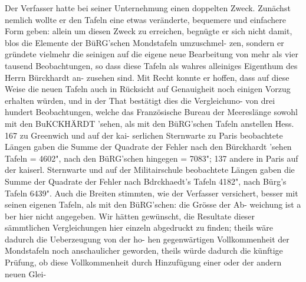 \documentclass[12pt,a4paper]{article}
\begin{document}
Der Verfasser hatte bei seiner Unternehmung einen doppelten Zweck. Zunächst nemlich wollte\newline
er den Tafeln eine etwas veränderte, bequemere und einfachere Form geben: allein um diesen Zweck\newline
zu erreichen, begnügte er sich nicht damit, blos die Elemente der BüRG'schen Mondstafeln umzuschmel-\newline
zen, sondern er gründete vielmehr die seinigen auf die eigene neue Bearbeitung von mehr als vier\newline
tausend Beobachtungen, so dass diese Tafeln als wahres alleiniges Eigenthum des Herrn Bürckhardt an-\newline
zusehen sind. Mit Recht konnte er hoffen, dass auf diese Weise die neuen Tafeln auch in Rücksicht\newline
auf Genauigheit noch einigen Vorzug erhalten würden, und in der That bestätigt dies die Vergleichuno-\newline
von drei hundert Beobachtungen, welche das Französische Bureau der Meereslänge sowohl mit den\newline
BuKCKHÄRDT 'sehen, als mit den BüRG'schen Tafeln anstellen Hess. 167 zu Greenwich und auf der kai-\newline
serlichen Sternwarte zu Paris beobachtete Längen gaben die Summe der Quadrate der Fehler nach den\newline
Bürckhardt 'sehen Tafeln = 4602", nach den BüRG'schen hingegen = 7083"; 137 andere in Paris auf der\newline
kaiserl. Sternwarte und auf der Militairschule beobachtete Längen gaben die Summe der Quadrate der\newline
Fehler nach Bdrckhaedt's Tafeln 4182", nach Bürg's Tafeln 6439". Auch die Breiten stimmten, wie\newline
der Verfasser versichert, besser mit seinen eigenen Tafeln, als mit den BüRG'schen: die Grösse der Ab-\newline
weichung ist a ber hier nicht angegeben. Wir hätten gewünscht, die Resultate dieser sämmtlichen\newline
Vergleichungen hier einzeln abgedruckt zu finden; theils wäre dadurch die Ueberzeugung von der ho-\newline
hen gegenwärtigen Vollkommenheit der Mondstafeln noch anschaulicher geworden, theils würde dadurch\newline
die künftige Prüfung, ob diese Vollkommenheit durch Hinzufügung einer oder der andern neuen Glei-\newline
\end{document}
